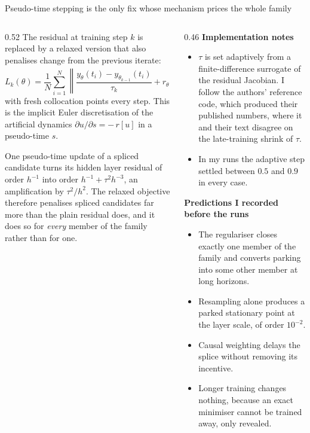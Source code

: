 \documentclass[aspectratio=169,10pt]{beamer}
\newcommand{\hl}[1]{{\color{accent}\textbf{#1}}}
\begin{document}
\begin{frame}[shrink=25]{Pseudo-time stepping is the only fix whose mechanism prices the whole family}
  \vspace{1mm}
  \begin{columns}[T]
    \begin{column}{0.52\textwidth}
      The residual at training step $k$ is replaced by a relaxed version that
      also penalises change from the previous iterate:
      \[ L_k(\theta) = \frac{1}{N} \sum_{i=1}^{N}
         \left\| \frac{y_\theta(t_i) - y_{\theta_{k-1}}(t_i)}{\tau_k}
         + r_\theta(t_i) \right\|^2 + L_{\mathrm{IC}}(\theta), \]
      with fresh collocation points every step. This is the implicit Euler
      discretisation of the artificial dynamics
      $\partial u/\partial s = -\,r[u]$ in a pseudo-time $s$.
      \medskip

      {\small One pseudo-time update of a spliced candidate turns its hidden
       layer residual of order $h^{-1}$ into order
       $h^{-1} + \tau^2 h^{-3}$, an amplification by \hl{$\tau^2/h^2$}. The
       relaxed objective therefore penalises spliced candidates far more than
       the plain residual does, and it does so for \emph{every} member of the
       family rather than for one.}
    \end{column}
    \begin{column}{0.46\textwidth}
      \textbf{Implementation notes}
      \begin{itemize}\small
        \item $\tau$ is set adaptively from a finite-difference surrogate of the
              residual Jacobian. I follow the authors' reference code, which
              produced their published numbers, where it and their text disagree
              on the late-training shrink of $\tau$.
        \item In my runs the adaptive step settled between $0.5$ and $0.9$ in
              every case.
      \end{itemize}
      \medskip

      \textbf{Predictions I recorded before the runs}
      \begin{itemize}\small
        \item The regulariser closes exactly one member of the family and
              converts parking into some other member at long horizons.
        \item Resampling alone produces a parked stationary point at the layer
              scale, of order $10^{-2}$.
        \item Causal weighting delays the splice without removing its incentive.
        \item Longer training changes nothing, because an exact minimiser cannot
              be trained away, only revealed.
      \end{itemize}
    \end{column}
  \end{columns}
\end{frame}
\end{document}
